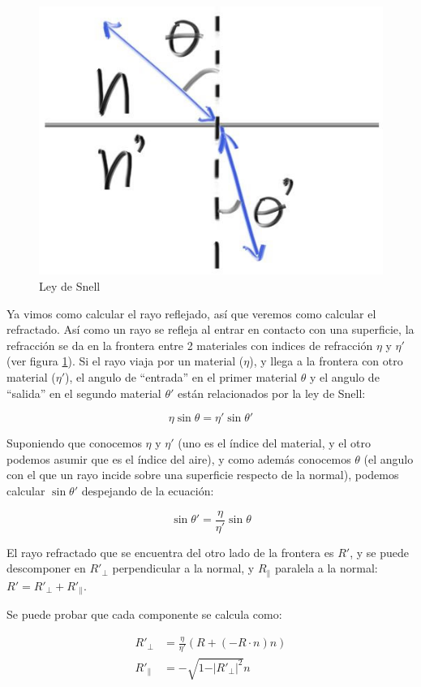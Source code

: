 \begin{figure}
    \centering
    \includegraphics[width=.7\textwidth]{imgs/refraction.jpg}
    \caption{Ley de Snell}
    \label{fig:snell-law}
\end{figure}

Ya vimos como calcular el rayo reflejado, así que veremos como calcular el
refractado. Así como un rayo se refleja al entrar en contacto con una
superficie, la refracción se da en la frontera entre 2 materiales con indices de
refracción $\eta$ y $\eta'$ (ver figura \ref{fig:snell-law}). Si el rayo viaja
por un material ($\eta$), y llega a la frontera con otro material ($\eta'$), el
angulo de ``entrada'' en el primer material $\theta$ y el angulo de ``salida'' en el
segundo material $\theta'$ están relacionados por la ley de Snell:

\[
    \eta \sin \theta = \eta' \sin \theta'
\]

Suponiendo que conocemos $\eta$ y $\eta'$ (uno es el índice del material, y el
otro podemos asumir que es el índice del aire), y como además conocemos $\theta$
(el angulo con el que un rayo incide sobre una superficie respecto de la
normal), podemos calcular $\sin \theta'$ despejando de la ecuación:

\[
    \sin \theta' = \frac{\eta}{\eta'} \sin \theta
\]

El rayo refractado que se encuentra del otro lado de la frontera es $R'$, y se
puede descomponer en $R'_{\perp}$ perpendicular a la normal, y
$R_{\parallel}$ paralela a la normal: $R' = R'_{\perp} + R'_{\parallel}$.

Se puede probar que cada componente se calcula como:

\begin{align*}
    R'_{\perp} &= \frac{\eta}{\eta'}(R + (-R \cdot n) n) \\
    R'_{\parallel} &= - \sqrt{1 - \vert R'_{\perp} \vert^2} n
\end{align*}


